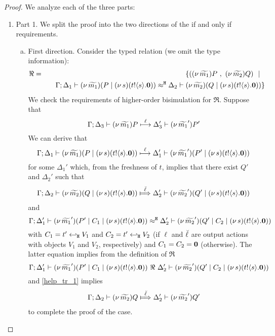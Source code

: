 \begin{proof}
We analyze each of the three parts:
\begin{enumerate}[$-$]
	\item Part 1. We split the proof into the two directions
	of the if and only if requirements.
	\begin{enumerate}[a)]
		\item	First direction. Consider the typed relation (we omit the type information):
				\begin{eqnarray*}
					\Re &=& \set{	(\news{\widetilde{m_1}}P\ , \ 
									\news{\widetilde{m_2}}Q) \setbar\\
					&&
									\quad \horel{\Gamma}{\Delta_1}{\newsp{\widetilde{m_1}}{P \Par \newsp{s}{\bout{t}{s} \inact}  } }
									{\hwb}
									{\Delta_2}{\newsp{\widetilde{m_2}}{Q \Par \newsp{s}{\bout{t}{s} \inact}  } }
					}
				\end{eqnarray*}
				We check the requirements of higher-order bisimulation
				for  $\Re$.
				Suppose that
				\[
					\Gamma; \Delta_3 \vdash (\nu\, \widetilde{m_1})P     \stackrel{\ell}{\longmapsto} \Delta_3' \vdash (\nu\, \widetilde{m_1}')P'
				\]
				We can derive that
				\[
					\Gamma; \Delta_1 \vdash (\nu\, \widetilde{m_1})(P \;|\; (\nu\, s)(t ! \langle s \rangle . \mathbf{0})  )  \stackrel{\ell}{\longmapsto} \Delta_1' \vdash (\nu\, \widetilde{m_1}')(P' \;|\; (\nu\, s)(t ! \langle s \rangle . \mathbf{0})  )
				\]
				for some $\Delta_1'$
				which, from the freshness of $t$, implies that there exist $Q'$ and $\Delta_2'$
				such that
				\begin{eqnarray}
					\horel{\Gamma}{\Delta_2}{\newsp{\widetilde{m_2}}{Q \Par \newsp{s}{\bout{t}{s} \inact}  } }
					{\Hby{\mact{\ell}}}
					{\Delta_2'}{\newsp{\widetilde{m_2}'}{Q' \Par \newsp{s}{\bout{t}{s} \inact}  } }
					\label{help_tr_1}
				\end{eqnarray}
				and
				\[
					\Gamma; \Delta_1' \vdash (\nu\, \widetilde{m_1}')(P' \;|\; C_1 \;|\; (\nu\, s)(t ! \langle s \rangle . \mathbf{0})  )  \approx^\mathtt{H} \Delta_2' \vdash (\nu\, \widetilde{m_2}')(Q' \;|\; C_2 \;|\; (\nu\, s)(t ! \langle s \rangle . \mathbf{0})  )
				\]
				with $C_1 = t' \hookleftarrow_{\mathtt{H}} V_1$ and $C_2 = t' \hookleftarrow_{\mathtt{H}} V_2$ (if $\ell$ and $\breve{\ell}$ are output actions
				with objects $V_1$ and $V_2$, respectively) and $C_1 = C_2 = \mathbf{0}$ (otherwise).
				The latter equation implies from the definition of $\Re$
				\[
					\Gamma; \Delta_1' \vdash (\nu\, \widetilde{m_1}')(P' \;|\; C_1 \;|\; (\nu\, s)(t ! \langle s \rangle . \mathbf{0})  )  \ \Re\  \Delta_2' \vdash (\nu\, \widetilde{m_2}')(Q' \;|\; C_2 \;|\; (\nu\, s)(t ! \langle s \rangle . \mathbf{0})  )
				\]
				and \eqref{help_tr_1} implies
				\begin{eqnarray*}
					\horel{\Gamma}{\Delta_2}{\news{\widetilde{m_2}}Q}
					{\Hby{\mact{\ell}}}
					{\Delta_2'}{\news{\widetilde{m_2}'} Q'}
				\end{eqnarray*}
				to complete the proof of the case.


\end{enumerate}
\end{enumerate}
\end{proof}
